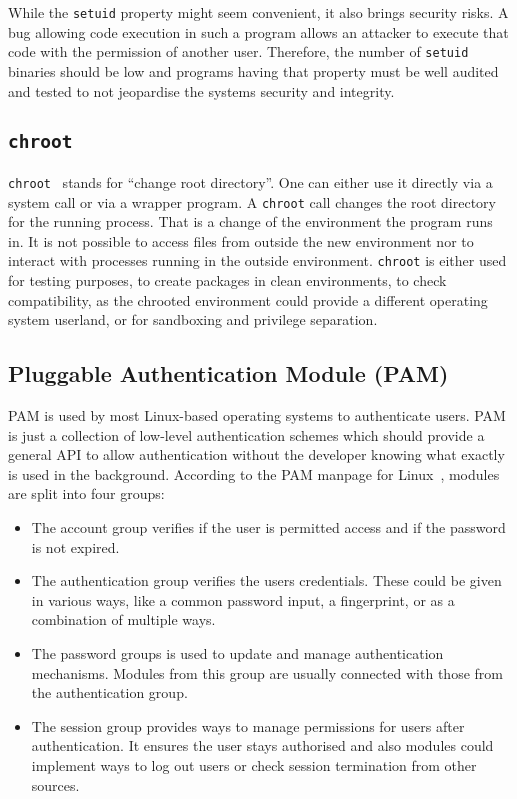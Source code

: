 While the \texttt{setuid} property might seem convenient, it also brings
security risks. A bug allowing code execution in such a program allows an
attacker to execute that code with the permission of another user. Therefore,
the number of \texttt{setuid} binaries should be low and programs having that
property must be well audited and tested to not jeopardise the
system\textquotesingle s security and integrity.

\subsection{\texttt{chroot}}

\texttt{chroot}~\cite{ogroupchroot} stands for ``change root directory''. One
can either use it directly via a system call or via a wrapper program. A
\texttt{chroot} call changes the root directory for the running process. That is
a change of the environment the program runs in. It is not possible to access
files from outside the new environment nor to interact with processes running in
the outside environment. \texttt{chroot} is either used for testing purposes, to
create packages in clean environments, to check compatibility, as the chrooted
environment could provide a different operating system userland, or for
sandboxing and privilege separation.

\subsection{Pluggable Authentication Module (PAM)}
\label{sec:pamgeneral}

PAM is used by most Linux-based operating systems to authenticate users. PAM is
just a collection of low-level authentication schemes which should provide a
general API to allow authentication without the developer knowing what exactly
is used in the background. According to the PAM manpage for Linux~\cite{pamman},
modules are split into four groups:

\begin{itemize}
\item The account group verifies if the user is permitted access and if the
password is not expired.
\item The authentication group verifies the user\textquotesingle s credentials.
These could be given in various ways, like a common password input, a
fingerprint, or as a combination of multiple ways.
\item The password groups is used to update and manage authentication
mechanisms. Modules from this group are usually connected with those from the
authentication group.
\item The session group provides ways to manage permissions for users after
authentication. It ensures the user stays authorised and also modules could
implement ways to log out users or check session termination from other sources.
\end{itemize}

